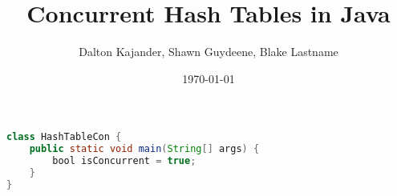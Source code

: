 \documentclass{article}
\begin{document}
\author{Dalton Kajander, Shawn Guydeene, Blake Lastname}
\title{Concurrent Hash Tables in Java}
\date{\today{}}

\maketitle


\begin{lstlisting}[language={Java},caption=Testing surce code in \LaTeX{}.,breaklines=true,frame=single]
class HashTableCon {
    public static void main(String[] args) {
        bool isConcurrent = true;
    }
}
\end{lstlisting}
\end{document}
